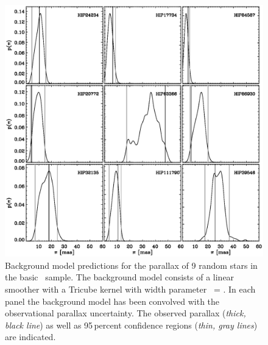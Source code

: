 \clearpage
\begin{figure}
\includegraphics[width=\textwidth]{figs_groups/predict_plx_background_random.ps}
\caption[Background model predictions for the parallax of 9 random
  stars in the basic \Hipparcos\ sample]{Background model predictions
  for the parallax of 9 random stars in the basic \Hipparcos\
  sample. The background model consists of a linear smoother with a
  Tricube kernel with width parameter \kernelwidth\ =
  \fiducialkernelwidth. In each panel the background model has been
  convolved with the observational parallax uncertainty. The observed
  parallax (\emph{thick, black line}) as well as 95\,percent
  confidence regions (\emph{thin, gray lines}) are
  indicated.}\label{fig:back_random}
\end{figure}


